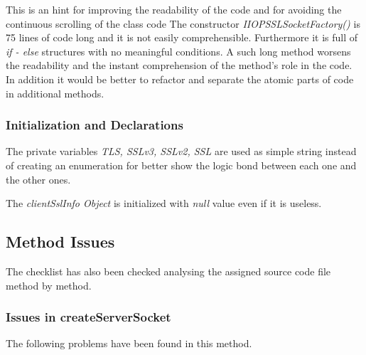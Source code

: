 \begin{itemize}
		This is an hint for improving the readability of the code and for avoiding the continuous scrolling of the class code
		The constructor \textit{IIOPSSLSocketFactory()} is 75 lines of code long and it is not easily comprehensible.
		Furthermore it is full of \textit{if - else} structures with no meaningful conditions.
		A such long method worsens the readability and the instant comprehension of the method's role in the code.
		In addition it would be better to refactor and separate the atomic parts of code in additional methods.
\end{itemize}

\subsubsection{Initialization and Declarations}
\begin{itemize}
	\begin{itemize}
		 The private variables \textit{TLS, SSLv3, SSLv2, SSL} are used as simple string instead of creating an enumeration for better show the logic bond between each one and the other ones.
	\end{itemize}
	\checklist{32}
	\begin{itemize}
		 The \textit{clientSslInfo Object} is initialized with \textit{null} value even if it is useless.
		\renderPartialCode{118}{118}
	\end{itemize}
\end{itemize}

\subsection{Method Issues}
The checklist has also been checked analysing the assigned source code file method by method.

\subsubsection{Issues in createServerSocket}
The following problems have been found in this method.


